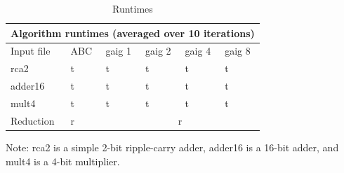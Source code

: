 \documentclass[twocolumn]{article}
\begin{document}
\begin {table}[T]
\caption {Runtimes} \label{tab:title}
\begin{center}
\begin{tabular}{ |p{2cm}|p{1cm}|p{1cm}|p{1cm}|p{1cm}|p{1cm}| }
\hline
\multicolumn{6}{|c|}{Algorithm runtimes (averaged over 10 iterations)} \\
\hline
Input file & ABC & gaig 1 & gaig 2 & gaig 4 & gaig 8 \\
\hline
rca2 & t & t & t & t & t \\
adder16 & t & t & t & t & t \\
mult4 & t & t & t & t & t \\
\hline
Reduction & r & \multicolumn{4}{|c|}{r} \\
\hline
\end{tabular}
Note: rca2 is a simple 2-bit ripple-carry adder, adder16 is a 16-bit adder, and mult4 is a 4-bit multiplier.
\end{center}
\end{table}
\end{document}
